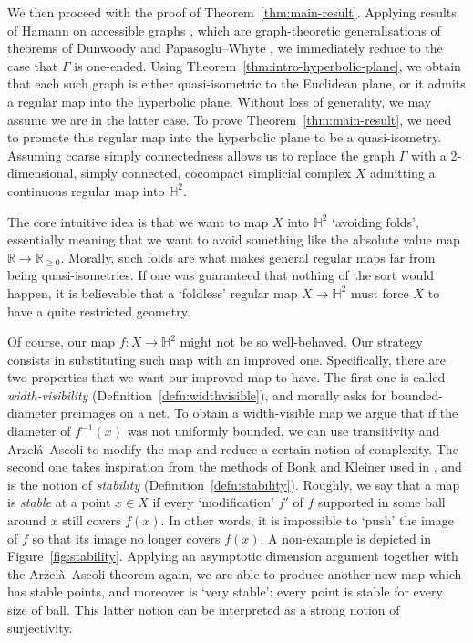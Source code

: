 \documentclass[11pt,a4paper]{amsart}
\theoremstyle{definition}
\begin{document}
We then proceed with the proof of Theorem~\ref{thm:main-result}. 
Applying results of Hamann on accessible graphs \cite{hamann2018accessibility, hamann2025tree}, which are graph-theoretic generalisations of theorems of Dunwoody \cite{dunwoody1985accessibility} and Papasoglu--Whyte \cite{papasoglu2002quasi}, we immediately reduce to the case that $\Gamma$ is one-ended.
Using Theorem~\ref{thm:intro-hyperbolic-plane}, we obtain that each such graph is either quasi-isometric to the Euclidean plane, or it admits a regular map into the hyperbolic plane. Without loss of generality, we may assume we are in the latter case. To prove Theorem~\ref{thm:main-result}, we need to promote this regular map into the hyperbolic plane to be a quasi-isometry. 
Assuming coarse simply connectedness allows us to replace the graph $\Gamma$ with a 2-dimensional, simply connected, cocompact simplicial complex $X$ admitting a continuous regular map into $\mathbb{H}^2$. 

The core intuitive idea is that we want to map $X$ into $\mathbb{H}^2$ `avoiding folds', essentially meaning that we want to avoid something like the absolute value map $\mathbb{R} \to \mathbb{R}_{\geq 0}$. Morally, such folds are what makes general regular maps far from being quasi-isometries. If one was guaranteed that nothing of the sort would happen, it is believable that a `foldless' regular map $X \to \mathbb{H}^2$ must force $X$ to have a quite restricted geometry. 

Of course, our map $f\colon X\to\mathbb{H}^2$ might not be so well-behaved. Our strategy consists in substituting such map with an improved one. Specifically, there are two properties that we want our improved map to have. The first one is called \emph{width-visibility} (Definition~\ref{defn:widthvisible}), and morally asks for bounded-diameter preimages on a net. To obtain a width-visible map we argue that if the diameter of $f^{-1}(x)$ was not uniformly bounded, we can use transitivity and Arzel\'a--Ascoli to modify the map and reduce a certain notion of complexity. The second one takes inspiration from the methods of Bonk and Kleiner used in \cite{bonk2002rigidity}, and is the notion of \emph{stability} (Definition~\ref{defn:stability}). Roughly, we say that a map is \emph{stable} at a point $x \in X$ if every `modification' $f'$ of $f$ supported in some ball around $x$ still covers $f(x)$. In other words, it is impossible to `push' the image of $f$ so that its image no longer covers $f(x)$. A non-example is depicted in Figure~\ref{fig:stability}. Applying an asymptotic dimension argument together with the Arzel\`a--Ascoli theorem again, we are able to produce another new map which has stable points, and moreover is `very stable': every point is stable for every size of ball.  This latter notion can be interpreted as a strong notion of surjectivity.
\end{document}
